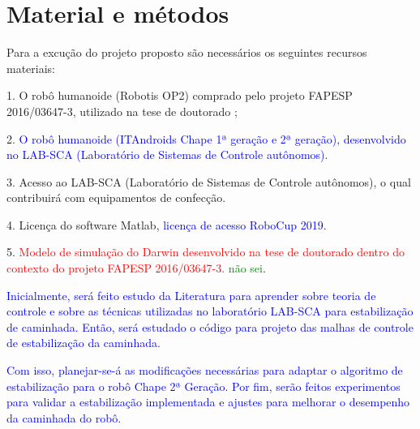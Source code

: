 
\section{Material e métodos}

Para a excução do projeto proposto são necessários os seguintes recursos materiais:

1.	O robô humanoide (Robotis OP2) comprado pelo  projeto FAPESP 2016/03647-3, utilizado na tese de doutorado \cite{tesemarcos};

2.	\textcolor{blue}{O robô humanoide (ITAndroids Chape 1ª geração e 2ª geração), desenvolvido no LAB-SCA (Laboratório de Sistemas de Controle autônomos)}.

3.	 Acesso ao LAB-SCA (Laboratório de Sistemas de Controle autônomos), o qual contribuirá com equipamentos de confecção.

4.	Licença do software Matlab, \textcolor{blue}{licença de acesso RoboCup 2019}.

5.	\textcolor{red}{Modelo de simulação do Darwin desenvolvido na tese de doutorado dentro do contexto do projeto FAPESP 2016/03647-3.} \textcolor{green}{não sei}.


\textcolor{blue}{Inicialmente, será feito estudo da Literatura para aprender sobre teoria de controle e sobre as técnicas utilizadas no laboratório LAB-SCA para estabilização de caminhada. Então, será estudado o código para projeto das malhas de controle de estabilização da caminhada.} 

\textcolor{blue}{Com isso, planejar-se-á as modificações necessárias para adaptar o algoritmo de estabilização para o robô Chape 2ª Geração. Por fim, serão feitos experimentos para validar a estabilização implementada e ajustes para melhorar o desempenho da caminhada do robô.}

\newpage





